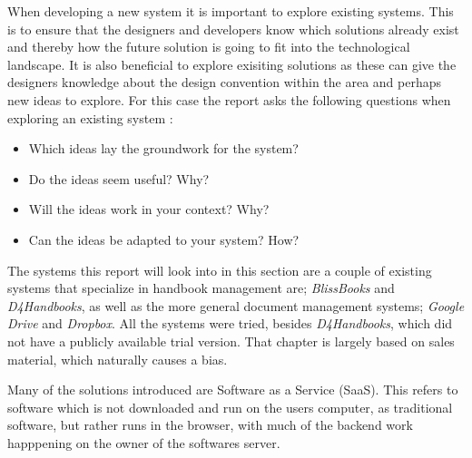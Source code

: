 When developing a new system it is important to explore existing systems.
This is to ensure that the designers and developers know which solutions already exist and thereby how the future solution is going to fit into the technological landscape.
It is also beneficial to explore exisiting solutions as these can give the designers knowledge about the design convention within the area and perhaps new ideas to explore.
For this case the report asks the following questions when exploring an existing system \citep[p.~33]{Rod-Aalborg}:

\begin{itemize}
  \item Which ideas lay the groundwork for the system?
  \item Do the ideas seem useful? Why?
  \item Will the ideas work in your context? Why?
  \item Can the ideas be adapted to your system? How?
\end{itemize}

The systems this report will look into in this section are a couple of existing systems that specialize in handbook management are; \textit{BlissBooks} and \textit{D4Handbooks}, as well as the more general document management systems; \textit{Google Drive} and \textit{Dropbox}. All the systems were tried, besides \textit{D4Handbooks}, which did not have a publicly available trial version. That chapter is largely based on sales material, which naturally causes a bias.

Many of the solutions introduced are Software as a Service (SaaS). This refers to software which is not downloaded and run on the users computer, as traditional software, but rather runs in the browser, with much of the backend work happpening on the owner of the softwares server.
